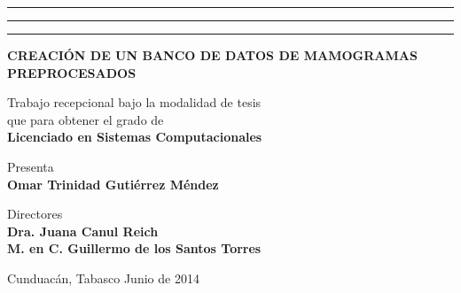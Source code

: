 {{    %
    \begin{minipage}[ht]{0.10\textwidth}
        \flushleft
        \rule{3pt}{16cm}
        \rule{4pt}{16cm}
        \rule{3pt}{16cm}
    \end{minipage}
    \begin{minipage}[th]{0.89\textwidth}
    \centering
    {\bfseries{\Large CREACIÓN DE UN BANCO DE DATOS DE MAMOGRAMAS
    PREPROCESADOS}}
    \vspace*{2\baselineskip} \vfill

    Trabajo recepcional bajo la modalidad de tesis \\
    que para obtener el grado de\\[\baselineskip]

    {\bfseries{\Large Licenciado en Sistemas Computacionales}}\\
    \vspace*{2\baselineskip} \vfill

    Presenta\\[\baselineskip]

    {\bfseries{\Large Omar Trinidad Gutiérrez Méndez}}\\
    \vspace*{2\baselineskip} \vfill

    Directores\\[\baselineskip]

    {\bfseries{\Large Dra. Juana Canul Reich}}\\
    {\bfseries{\Large M. en C. Guillermo de los Santos Torres}}\\
    \vspace*{2\baselineskip} \vfill

    Cunduacán, Tabasco \hfill Junio de 2014
    \end{minipage}

} %

\newpage
\thispagestyle{empty}
\mbox{}

{\selectfont

    \newpage
    \thispagestyle{empty}

    \setcounter{page}{3}

}}
